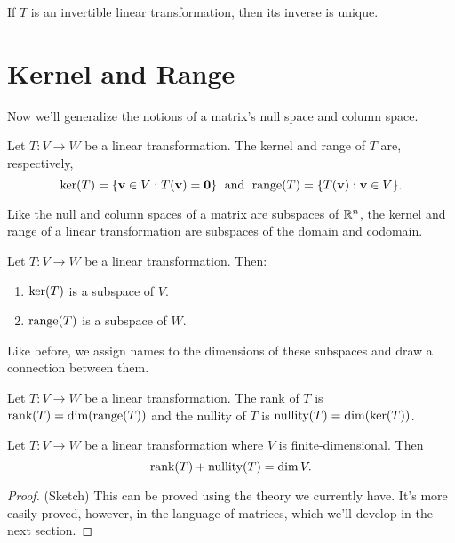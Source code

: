 \documentclass[../m073main.tex]{subfiles}
\begin{document}
\begin{theorem}
	If $T$ is an invertible linear transformation, then its inverse is unique.
\end{theorem}

\section{Kernel and Range}
Now we'll generalize the notions of a matrix's null space and column space.

\begin{definition}
	Let $T : V \to W$ be a linear transformation.
	The kernel and range of $T$ are, respectively,
	\[ \textrm{ker}(T) = \{\mathbf{v} \in V : T(\mathbf{v}) = \mathbf{0}\} \;\text{ and }\; \textrm{range}(T) = \{T(\mathbf{v}) : \mathbf{v} \in V\}. \]
\end{definition}

Like the null and column spaces of a matrix are subspaces of $\mathbb{R}^n$, the kernel and range of a linear transformation are subspaces of the domain and codomain.

\begin{theorem}
	Let $T : V \to W$ be a linear transformation.
	Then:
	\begin{enumerate}[label=(\alph*)]
		\item $\textrm{ker}(T)$ is a subspace of $V$.
		\item $\textrm{range}(T)$ is a subspace of $W$.
	\end{enumerate}
\end{theorem}

Like before, we assign names to the dimensions of these subspaces and draw a connection between them.

\pagebreak

\begin{definition}
	Let $T : V \to W$ be a linear transformation.
	The rank of $T$ is $\textrm{rank}(T) = \dim (\textrm{range}(T))$ and the nullity of $T$ is $\textrm{nullity}(T) = \dim (\textrm{ker}(T))$.
\end{definition}

\begin{theorem}
	Let $T : V \to W$ be a linear transformation where $V$ is finite-dimensional.
	Then
	\[ \textrm{rank}(T) + \textrm{nullity}(T) = \dim V. \]
\end{theorem}

\begin{proof}
	(Sketch) This can be proved using the theory we currently have.
	It's more easily proved, however, in the language of matrices, which we'll develop in the next section.
\end{proof}
\end{document}
